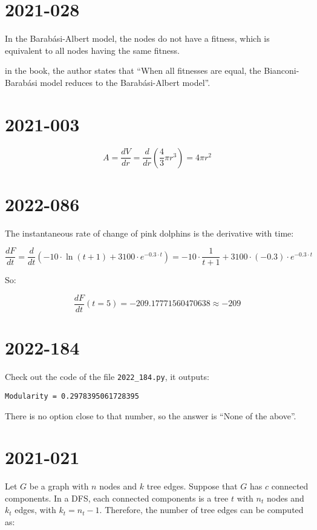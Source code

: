 \documentclass{article}
\begin{document}
\section{2021-028}\label{2021-028}

In the Barabási-Albert model, the nodes do not have a fitness, which is equivalent to all nodes having the same fitness.

in the book, the author states that ``When all fitnesses are equal, the Bianconi-Barabási model reduces to the Barabási-Albert model''.

\section{2021-003}\label{2021-003}

$$
A = \dfrac{dV}{dr} = \dfrac{d}{dr}\left( \dfrac{4}{3} \pi r^3 \right) = 4 \pi r^2
$$

\section{2022-086}\label{2022-086}

The instantaneous rate of change of pink dolphins is the derivative with time:

$$
\dfrac{dF}{dt}
=
\dfrac{d}{dt} \left( -10 \cdot \ln(t+1) + 3100 \cdot e^{-0.3 \cdot t}\right)
=
-10 \cdot \dfrac{1}{t+1} + 3100 \cdot (-0.3) \cdot e^{-0.3 \cdot t}
$$

So:

$$
\dfrac{dF}{dt}(t = 5) = -209.17771560470638 \approx -209
$$

\section{2022-184}\label{2022-184}

Check out the code of the file \verb|2022_184.py|, it outputs:

\begin{verbatim}
Modularity = 0.2978395061728395
\end{verbatim}

There is no option close to that number, so the answer is ``None of the above''.

\section{2021-021}\label{2021-021}

Let $G$ be a graph with $n$ nodes and $k$ tree edges. Suppose that $G$ has $c$ connected components. In a DFS, each connected components is a tree $t$ with $n_t$ nodes and $k_t$ edges, with $k_t = n_t - 1$. Therefore, the number of tree edges can be computed as:
\end{document}
